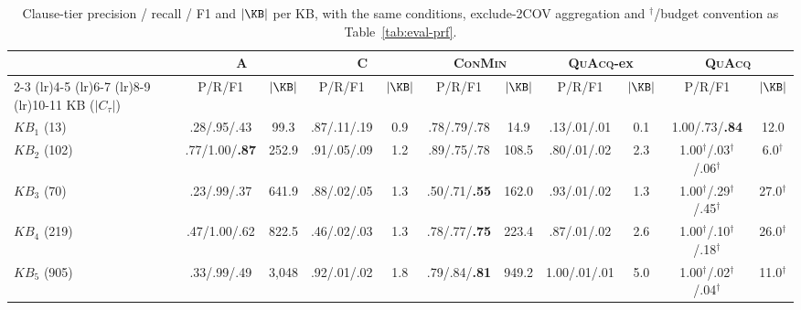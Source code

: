 \begin{table}[t]
\centering
\small
\setlength{\tabcolsep}{4pt}
\begin{tabular}{lcccccccccc}
\toprule
 & \multicolumn{2}{c}{A} & \multicolumn{2}{c}{C} & \multicolumn{2}{c}{\textsc{ConMin}} & \multicolumn{2}{c}{\textsc{QuAcq}-ex} & \multicolumn{2}{c}{\textsc{QuAcq}} \tabularnewline
\cmidrule(lr){2-3} \cmidrule(lr){4-5} \cmidrule(lr){6-7} \cmidrule(lr){8-9} \cmidrule(lr){10-11}
KB ($|C_\tau|$) & P/R/F1 & $|\KB|$ & P/R/F1 & $|\KB|$ & P/R/F1 & $|\KB|$ & P/R/F1 & $|\KB|$ & P/R/F1 & $|\KB|$ \tabularnewline
\midrule
$KB_{1}$ (13) & .28/.95/.43 & 99.3 & .87/.11/.19 & 0.9 & .78/.79/.78 & 14.9 & .13/.01/.01 & 0.1 & 1.00/.73/\textbf{.84} & 12.0 \tabularnewline
$KB_{2}$ (102) & .77/1.00/\textbf{.87} & 252.9 & .91/.05/.09 & 1.2 & .89/.75/.78 & 108.5 & .80/.01/.02 & 2.3 & 1.00$^{\dagger}$/.03$^{\dagger}$/.06$^{\dagger}$ & 6.0$^{\dagger}$ \tabularnewline
$KB_{3}$ (70) & .23/.99/.37 & 641.9 & .88/.02/.05 & 1.3 & .50/.71/\textbf{.55} & 162.0 & .93/.01/.02 & 1.3 & 1.00$^{\dagger}$/.29$^{\dagger}$/.45$^{\dagger}$ & 27.0$^{\dagger}$ \tabularnewline
$KB_{4}$ (219) & .47/1.00/.62 & 822.5 & .46/.02/.03 & 1.3 & .78/.77/\textbf{.75} & 223.4 & .87/.01/.02 & 2.6 & 1.00$^{\dagger}$/.10$^{\dagger}$/.18$^{\dagger}$ & 26.0$^{\dagger}$ \tabularnewline
$KB_{5}$ (905) & .33/.99/.49 & 3,048 & .92/.01/.02 & 1.8 & .79/.84/\textbf{.81} & 949.2 & 1.00/.01/.01 & 5.0 & 1.00$^{\dagger}$/.02$^{\dagger}$/.04$^{\dagger}$ & 11.0$^{\dagger}$ \tabularnewline
\bottomrule
\end{tabular}
\caption{Clause-tier precision / recall / F1 and $|\KB|$ per KB, with the same conditions, exclude-2COV aggregation and $^{\dagger}$/budget convention as Table~\ref{tab:eval-prf}.}
\label{tab:app-prf-clause}
\end{table}
